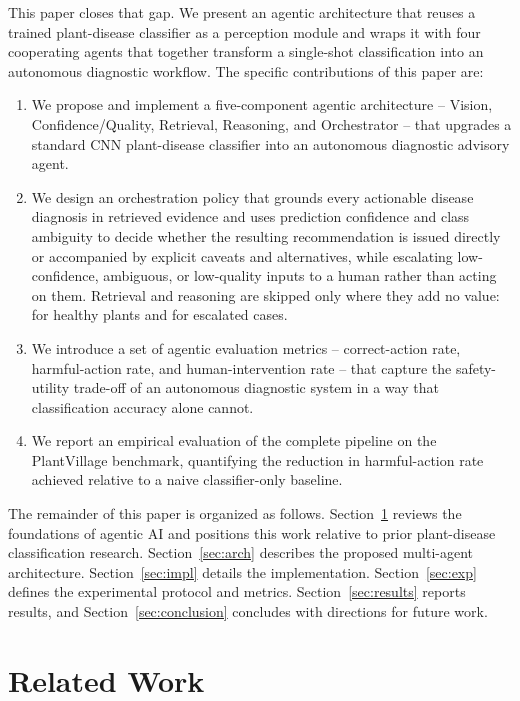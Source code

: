 \documentclass[conference]{IEEEtran}
\begin{document}
This paper closes that gap. We present an agentic architecture that reuses a trained plant-disease classifier as a perception module and wraps it with four cooperating agents that together transform a single-shot classification into an autonomous diagnostic workflow. The specific contributions of this paper are:

\begin{enumerate}
\item We propose and implement a five-component agentic architecture -- Vision, Confidence/Quality, Retrieval, Reasoning, and Orchestrator -- that upgrades a standard CNN plant-disease classifier into an autonomous diagnostic advisory agent.
\item We design an orchestration policy that grounds every actionable disease diagnosis in retrieved evidence and uses prediction confidence and class ambiguity to decide whether the resulting recommendation is issued directly or accompanied by explicit caveats and alternatives, while escalating low-confidence, ambiguous, or low-quality inputs to a human rather than acting on them. Retrieval and reasoning are skipped only where they add no value: for healthy plants and for escalated cases.
\item We introduce a set of agentic evaluation metrics -- correct-action rate, harmful-action rate, and human-intervention rate -- that capture the safety-utility trade-off of an autonomous diagnostic system in a way that classification accuracy alone cannot.
\item We report an empirical evaluation of the complete pipeline on the PlantVillage benchmark, quantifying the reduction in harmful-action rate achieved relative to a naive classifier-only baseline.
\end{enumerate}

The remainder of this paper is organized as follows. Section~\ref{sec:related} reviews the foundations of agentic AI and positions this work relative to prior plant-disease classification research. Section~\ref{sec:arch} describes the proposed multi-agent architecture. Section~\ref{sec:impl} details the implementation. Section~\ref{sec:exp} defines the experimental protocol and metrics. Section~\ref{sec:results} reports results, and Section~\ref{sec:conclusion} concludes with directions for future work.

\section{Related Work}
\label{sec:related}
\end{document}

